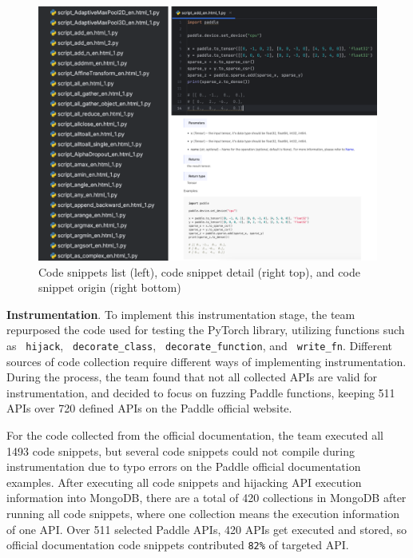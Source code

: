 \documentclass[sigconf]{acmart}
\begin{document}
  \begin{figure}[h]
    \centering
    \includegraphics[width=\linewidth]{2.png}
    \caption{Code snippets list (left), code snippet detail (right top), and code snippet origin (right bottom)}
  \end{figure}  

  \textbf{Instrumentation}. To implement this instrumentation stage, the team repurposed the code used for testing the PyTorch library, 
  utilizing functions such as \verb| hijack|, \verb| decorate_class|, \verb| decorate_function|, and \verb| write_fn|. Different sources of code collection require different ways of implementing instrumentation. 
  During the process, the team found that not all collected APIs are valid for instrumentation, and decided to focus on fuzzing Paddle functions, keeping 511 APIs over 720 defined APIs on the Paddle official website.
  
  \par For the code collected from the official documentation, the team executed all 1493 code snippets, but several code snippets could not compile during instrumentation due to typo errors on the Paddle official documentation examples. 
  After executing all code snippets and hijacking API execution information into MongoDB, there are a total of 420 collections in MongoDB after running all code snippets, 
  where one collection means the execution information of one API. Over 511 selected Paddle APIs, 420 APIs get executed and stored, so official documentation code snippets contributed \verb|82%| of targeted API.
\end{document}
